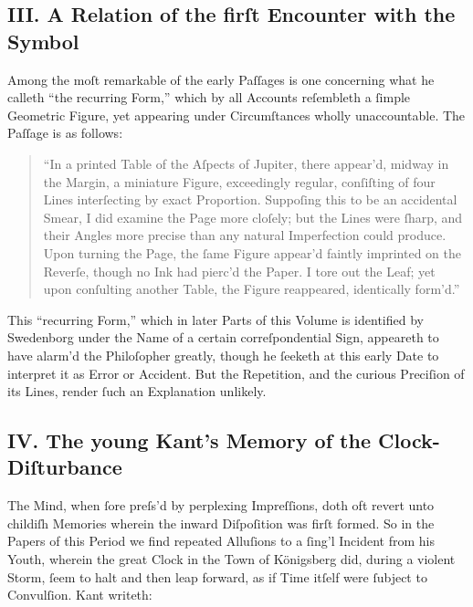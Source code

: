 \documentclass[12pt]{article}
\begin{document}
\subsection*{III. A Relation of the firſt Encounter with the Symbol}

Among the moſt remarkable of the early Paſſages is one concerning what he 
calleth “the recurring Form,” which by all Accounts reſembleth a ſimple 
Geometric Figure, yet appearing under Circumſtances wholly unaccountable. 
The Paſſage is as follows:

\begin{quote}
\small
“In a printed Table of the Aſpects of Jupiter, there appear’d, midway in the 
Margin, a miniature Figure, exceedingly regular, conſiſting of four Lines 
interſecting by exact Proportion. Suppoſing this to be an accidental Smear, 
I did examine the Page more cloſely; but the Lines were ſharp, and their 
Angles more precise than any natural Imperfection could produce. Upon 
turning the Page, the ſame Figure appear’d faintly imprinted on the Reverſe, 
though no Ink had pierc’d the Paper. I tore out the Leaf; yet upon conſulting 
another Table, the Figure reappeared, identically form’d.”
\end{quote}

This “recurring Form,” which in later Parts of this Volume is identified by 
Swedenborg under the Name of a certain correſpondential Sign, appeareth to 
have alarm’d the Philoſopher greatly, though he ſeeketh at this early Date 
to interpret it as Error or Accident. But the Repetition, and the curious 
Preciſion of its Lines, render ſuch an Explanation unlikely.

\subsection*{IV. The young Kant’s Memory of the Clock-Diſturbance}

The Mind, when ſore preſs’d by perplexing Impreſſions, doth oft revert unto 
childiſh Memories wherein the inward Diſpoſition was firſt formed. So in the 
Papers of this Period we find repeated Alluſions to a ſing’l Incident from his 
Youth, wherein the great Clock in the Town of Königsberg did, during a 
violent Storm, ſeem to halt and then leap forward, as if Time itſelf were 
ſubject to Convulſion. Kant writeth:
\end{document}
